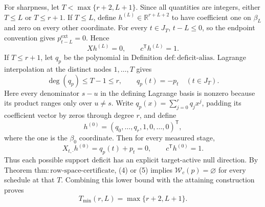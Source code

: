 For sharpness, let \(T<\max\{r+2,L+1\}\).  Since all quantities are integers, either \(T\le L\) or \(T\le r+1\).  If \(T\le L\), define \(h^{(L)}\in\mathbb R^{r+L+2}\) to have coefficient one on \(\beta_L\) and zero on every other coordinate.  For every \(t\in J_T\), \(t-L\le0\), so the endpoint convention gives \(p_{t-L}^{\mathrm{ext}}=0\).  Hence
\[
 Xh^{(L)}=0,
 \qquad c^{\mathsf T}h^{(L)}=1. \tag{4}
\]
If \(T\le r+1\), let \(q_p\) be the polynomial in Definition \(\mathrm{def:deficit\text{-}alias}\).  Lagrange interpolation at the distinct nodes \(1,\ldots,T\) gives
\[
 \deg(q_p)\le T-1\le r,
 \qquad q_p(t)=-p_t\quad(t\in J_T).
\]
Here every denominator \(s-u\) in the defining Lagrange basis is nonzero because its product ranges only over \(u\ne s\).  
Write \(q_p(x)=\sum_{j=0}^{r}q_jx^j\), padding its coefficient vector by zeros through degree \(r\), and define
\[
 h^{(0)}=(q_0,\ldots,q_r,1,0,\ldots,0)^{\mathsf T},
\]
where the one is the \(\beta_0\) coordinate.  Then for every measured stage,
\[
 X_{t,\cdot}h^{(0)}=q_p(t)+p_t=0,
 \qquad c^{\mathsf T}h^{(0)}=1. \tag{5}
\]
Thus each possible support deficit has an explicit target-active null direction.  By Theorem \(\mathrm{thm:row\text{-}space\text{-}certificate}\), (4) or (5) implies \(\mathcal W_c(p)=\varnothing\) for every schedule at that \(T\).  Combining this lower bound with the attaining construction proves
\[
 T_{\min}(r,L)=\max\{r+2,L+1\}.
\]